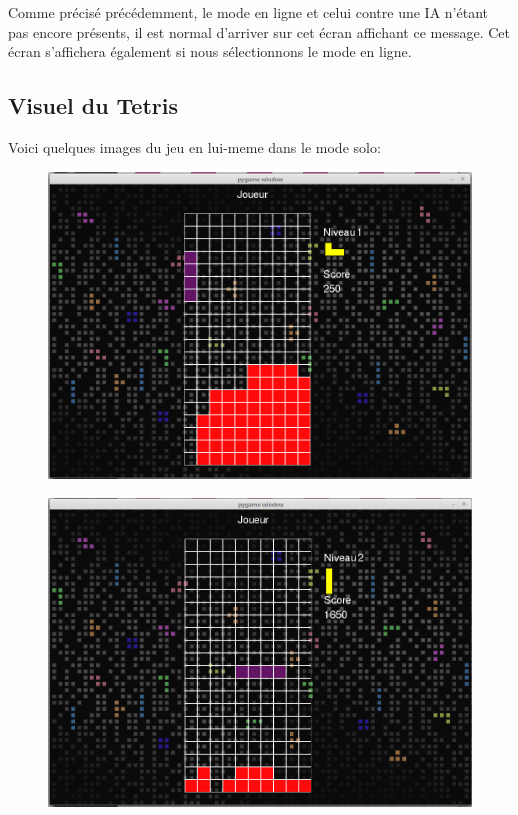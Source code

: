 \documentclass[a4paper, 11pt]{article}
\begin{document}
            Comme précisé précédemment, le mode en ligne et celui contre une IA n'étant pas encore présents, il est normal d'arriver sur cet écran affichant ce message. Cet écran s'affichera également si nous sélectionnons le mode en ligne. 
            
        \newpage
        \subsection{Visuel du Tetris}
            Voici quelques images du jeu en lui-meme dans le mode solo:
            
            \begin{figure}[ht]
                \centering
                \includegraphics[scale=0.25]{images/jeu3.png}
                
            \end{figure}
            
            \begin{figure}[ht]
                \centering
                \includegraphics[scale=0.25]{images/jeu1.png}
            \end{figure}
            
\end{document}
